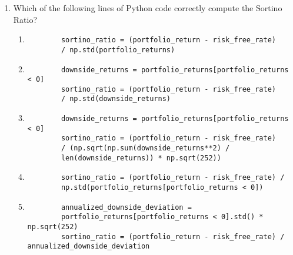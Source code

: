 \documentclass{article}
\begin{document}
\begin{enumerate}
    \item Which of the following lines of Python code correctly compute the Sortino Ratio?
    \begin{enumerate}
        \item \begin{verbatim}
        sortino_ratio = (portfolio_return - risk_free_rate)
        / np.std(portfolio_returns)
        \end{verbatim}
        \item \begin{verbatim}
        downside_returns = portfolio_returns[portfolio_returns < 0]
        sortino_ratio = (portfolio_return - risk_free_rate)
        / np.std(downside_returns)
        \end{verbatim}
        \item \begin{verbatim}
        downside_returns = portfolio_returns[portfolio_returns < 0]
        sortino_ratio = (portfolio_return - risk_free_rate)
        / (np.sqrt(np.sum(downside_returns**2) / 
        len(downside_returns)) * np.sqrt(252))
        \end{verbatim}
        \item \begin{verbatim}
        sortino_ratio = (portfolio_return - risk_free_rate) /
        np.std(portfolio_returns[portfolio_returns < 0])
        \end{verbatim}
        \item \begin{verbatim}
        annualized_downside_deviation = 
        portfolio_returns[portfolio_returns < 0].std() * np.sqrt(252)
        sortino_ratio = (portfolio_return - risk_free_rate) / annualized_downside_deviation
        \end{verbatim}
    \end{enumerate}


\end{enumerate}
\end{document}
